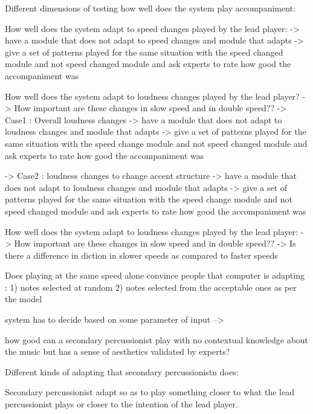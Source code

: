 

Different dimensions of testing how well does the system play accompaniment:

\item How well does the system adapt to speed changes played by the lead player:
  -> have a module that does not adapt to speed changes and module that adapts
  -> give a set of patterns played for the same situation with the speed changed module and not speed changed module and ask experts to rate how good the accompaniment was

\item How well does the system adapt to loudness changes played by the lead player? 
  -> How important are these changes in slow speed and in double speed??
  -> Case1 : Overall loudness changes
      -> have a module that does not adapt to loudness changes and module that adapts
      -> give a set of patterns played for the same situation with the speed change module and not speed changed module and ask experts to rate how good the accompaniment was

  -> Case2 : loudness changes to change accent structure
       -> have a module that does not adapt to loudness changes and module that adapts
       -> give a set of patterns played for the same situation with the speed change module and not speed changed module and ask experts to rate how good the accompaniment was

\item How well does the system adapt to loudness changes played by the lead player:
    -> How important are these changes in slow speed and in double speed??
    -> Is there a difference in diction in slower speeds as compared to faster speeds

\item Does playing at the same speed alone convince people that computer is adapting : 1) notes selected at random 2) notes selected from the acceptable ones as per the model

system has to decide based on some parameter of input -->



how good can a secondary percussionist play with no contextual knowledge about the music but has a sense of aesthetics validated by experts?

Different kinds of adapting that secondary percussionistn does:

Secondary percussionist adapt so as to play something closer to what the lead percussionist plays or closer to the intention of the lead player. 

